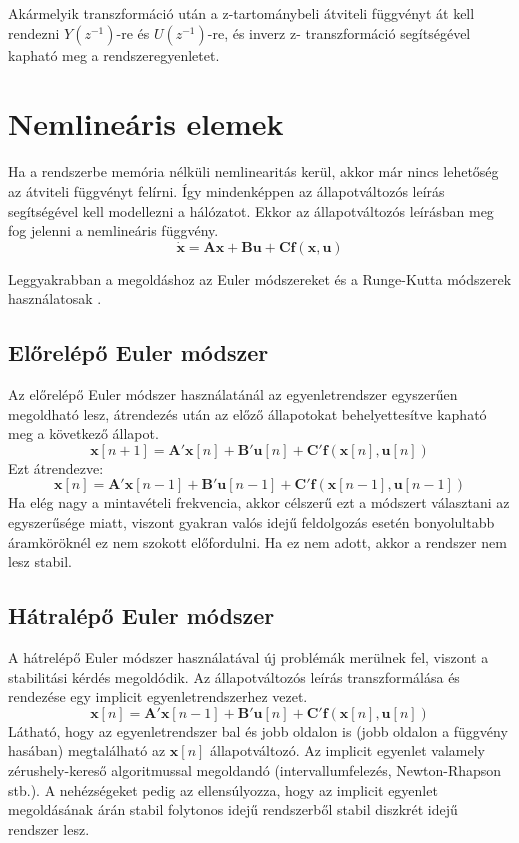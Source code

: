 Akármelyik transzformáció után a z-tartománybeli átviteli függvényt át kell rendezni $Y(z^{-1})$-re és $U(z^{-1})$-re, és inverz z-
transzformáció segítségével kapható meg a rendszeregyenletet.

\section{Nemlineáris elemek}
Ha a rendszerbe memória nélküli nemlinearitás kerül, akkor már nincs lehetőség az átviteli függvényt felírni. Így 
mindenképpen az állapotváltozós leírás segítségével kell modellezni a hálózatot. Ekkor az állapotváltozós leírásban 
meg fog jelenni a nemlineáris függvény.
\begin{equation}
    \mathbf{\dot{x}}=\mathbf{A}\mathbf{x}+\mathbf{Bu}+\mathbf{Cf}(\mathbf{x},\mathbf{u})
\end{equation}

Leggyakrabban a megoldáshoz az Euler módszereket és a Runge-Kutta módszerek használatosak \cite{eulers} \cite{rungekutta} \cite{rkk}.

\subsection{Előrelépő Euler módszer}
Az előrelépő Euler módszer használatánál az egyenletrendszer egyszerűen megoldható lesz, átrendezés után az előző 
állapotokat behelyettesítve kapható meg a következő állapot.
\begin{equation}
    \mathbf{x}[n+1]=\mathbf{A'}\mathbf{x}[n]+\mathbf{B'u}[n]+\mathbf{C'f}(\mathbf{x}[n], \mathbf{u}[n])
\end{equation}
Ezt átrendezve:
\begin{equation}
    \mathbf{x}[n]=\mathbf{A'}\mathbf{x}[n-1]+\mathbf{B'u}[n-1]+\mathbf{C'f}(\mathbf{x}[n-1],\mathbf{u}[n-1])
\end{equation}
Ha elég nagy a mintavételi frekvencia, akkor célszerű ezt a módszert választani az egyszerűsége miatt, viszont 
gyakran valós idejű feldolgozás esetén bonyolultabb áramköröknél ez nem szokott előfordulni. Ha ez nem adott, akkor 
a rendszer nem lesz stabil.

\subsection{Hátralépő Euler módszer}
A hátrelépő Euler módszer használatával új problémák merülnek fel, viszont a stabilitási kérdés megoldódik. 
Az állapotváltozós leírás transzformálása és rendezése egy implicit egyenletrendszerhez vezet.
\begin{equation}
    \mathbf{x}[n]=\mathbf{A'}\mathbf{x}[n-1]+\mathbf{B'u}[n]+\mathbf{C'f}(\mathbf{x}[n],\mathbf{u}[n])
\end{equation}
Látható, hogy az egyenletrendszer bal és jobb oldalon is (jobb oldalon a függvény hasában) megtalálható az $\mathbf{x}[n]$ 
állapotváltozó. Az implicit egyenlet valamely zérushely-kereső algoritmussal megoldandó 
(intervallumfelezés, Newton-Rhapson stb.). A nehézségeket pedig az ellensúlyozza, hogy az implicit egyenlet megoldásának 
árán stabil folytonos idejű rendszerből stabil diszkrét idejű rendszer lesz.


